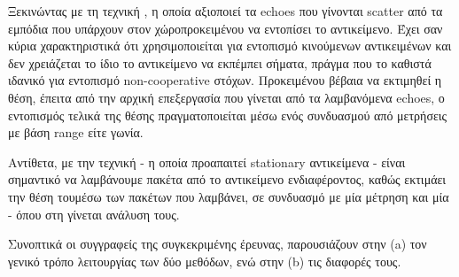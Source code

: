Ξεκινώντας με τη τεχνική , η οποία αξιοποιεί τα echoes που
γίνονται scatter από τα εμπόδια που υπάρχουν στον χώρο\udot προκειμένου να εντοπίσει το αντικείμενο. Έχει σαν κύρια χαρακτηριστικά 
ότι χρησιμοποιείται για εντοπισμό κινούμενων α\-ντι\-κειμένων και δεν χρειάζεται το ίδιο το αντικείμενο να εκπέμπει σήματα, πράγμα που 
το καθιστά ιδανικό για εντοπισμό non-cooperative στόχων. Προκειμένου βέβαια να εκτιμηθεί η θέση, έπειτα από την αρχική επεξεργασία 
που γίνεται από τα λαμβανόμενα echoes, ο εντοπισμός τελικά της θέσης πραγματοποιείται μέσω ενός συνδυασμού από μετρήσεις με βάση 
range είτε γωνία. 

Αντίθετα, με την τεχνική  - η οποία προαπαιτεί stationary αντικείμενα - είναι σημαντικό να λαμβάνουμε πακέτα από το 
αντικείμενο ενδιαφέροντος, καθώς εκτιμάει την θέση του\udot μέσω των πακέτων που λαμβάνει, σε συνδυασμό με μία μέτρηση  
και μία  - όπου στη  γίνεται ανάλυση τους.

Συνοπτικά οι συγγραφείς της συγκεκριμένης έρευνας, παρουσιάζουν στην  (a) τον γενικό τρόπο λειτουργίας των δύο 
μεθόδων, ενώ στην  (b) τις διαφορές τους.

